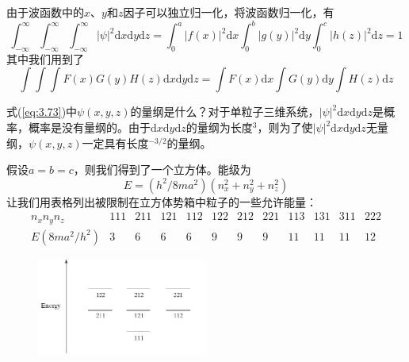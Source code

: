 	由于波函数中的$x$、$y$和$z$因子可以独立归一化，将波函数归一化，有
	\begin{equation*}
		\int_{-\infty}^{\infty}\int_{-\infty}^{\infty}\int_{-\infty}^{\infty}\left|\psi\right|^2\mathrm{d}x\mathrm{d}y\mathrm{d}z = \int_{0}^{a}\left|f\left(x\right)\right|^2\mathrm{d}x\int_{0}^{b}\left|g\left(y\right)\right|^2\mathrm{d}y\int_{0}^{c}\left|h\left(z\right)\right|^2\mathrm{d}z=1
	\end{equation*}
	其中我们用到了
	\begin{equation}
		\boxed{
			\int\int\int F\left(x\right)G\left(y\right)H\left(z\right)\mathrm{d}x\mathrm{d}y\mathrm{d}z = \int F\left(x\right)\mathrm{d}x\int G\left(y\right)\mathrm{d}y\int H\left(z\right)\mathrm{d}z
		}
		\label{eq:3.74}
	\end{equation}

	式(\ref{eq:3.73})中$\psi\left(x,y,z\right)$的量纲是什么？对于单粒子三维系统，$\left|\psi\right|^2\mathrm{d}x\mathrm{d}y\mathrm{d}z$是概率，概率是没有量纲的。由于$\mathrm{d}x\mathrm{d}y\mathrm{d}z$的量纲为长度$^3$，则为了使$\left|\psi\right|^2\mathrm{d}x\mathrm{d}y\mathrm{d}z$无量纲，$\psi\left(x,y,z\right)$一定具有长度$^{-3/2}$的量纲。

	假设$a=b=c$，则我们得到了一个立方体。能级为
	\begin{equation}
		E = \left(h^2/8ma^2\right)\left(n_x^2+n_y^2+n_z^2\right)
		\label{eq:3.75}
	\end{equation}
	让我们用表格列出被限制在立方体势箱中粒子的一些允许能量：
	\begin{equation*}
		\begin{array}{c|c|c|c|c|c|c|c|c|c|c|c}
			n_xn_yn_z & 111 & 211 & 121 & 112 & 122 & 212 & 221 & 113 & 131 & 311 & 222 \\
			\hline E\left(8ma^2/h^2\right) & 3 & 6 & 6 & 6 & 9 & 9 & 9 & 11 & 11 & 11 & 12
		\end{array}
	\end{equation*}
	\begin{figure}[h!]
		\centering
		\includegraphics[width=0.5\textwidth]{Figures/3.3.png}  %
		\caption{}
		\label{fig:3.3}
	\end{figure}
	
